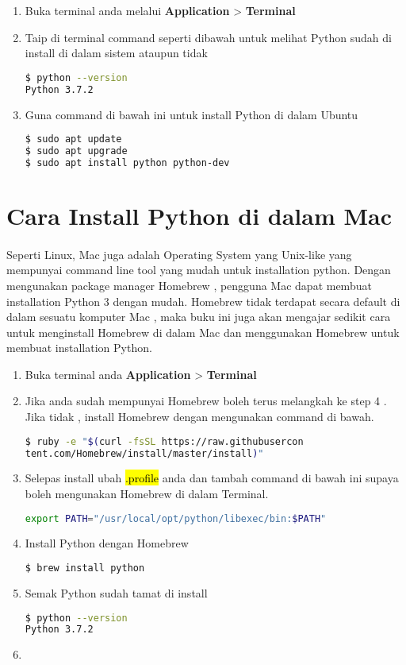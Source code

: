 \begin{enumerate}
	\item Buka terminal anda melalui \textbf{Application} > \textbf{Terminal} 
	\item Taip di terminal command seperti dibawah untuk melihat Python sudah di install di dalam sistem ataupun tidak
		\begin{lstlisting}[language=bash]
$ python --version
Python 3.7.2
		\end{lstlisting}
	\item Guna command di bawah ini untuk install Python di dalam Ubuntu
		\begin{lstlisting}[language=bash]
$ sudo apt update
$ sudo apt upgrade
$ sudo apt install python python-dev
		\end{lstlisting}
\end{enumerate}

\section{Cara Install Python di dalam Mac}


\paragraph{}
Seperti Linux, Mac juga adalah Operating System yang Unix-like yang mempunyai command line tool yang mudah untuk installation python. Dengan mengunakan package manager Homebrew , pengguna Mac dapat membuat installation Python 3 dengan mudah.
Homebrew tidak terdapat secara default di dalam sesuatu komputer Mac , maka buku ini juga akan mengajar sedikit cara untuk menginstall Homebrew di dalam Mac dan menggunakan Homebrew untuk membuat installation Python.

\begin{enumerate}
	\item Buka terminal anda \textbf{Application} > \textbf{Terminal} 
	\item Jika anda sudah mempunyai Homebrew boleh terus melangkah ke step 4 . Jika tidak , install Homebrew dengan mengunakan command di bawah. 
		\begin{lstlisting}[language=bash]
$ ruby -e "$(curl -fsSL https://raw.githubusercon
tent.com/Homebrew/install/master/install)"
		\end{lstlisting}
	\item Selepas install ubah \hl{.profile} anda dan tambah command di bawah ini supaya boleh mengunakan Homebrew di dalam Terminal. 
		\begin{lstlisting}[language=bash]
export PATH="/usr/local/opt/python/libexec/bin:$PATH"
		\end{lstlisting}
	\item Install Python dengan Homebrew
		\begin{lstlisting}[language=bash]
$ brew install python
		\end{lstlisting}
	\item Semak Python sudah tamat di install 
		\begin{lstlisting}[language=bash]
$ python --version
Python 3.7.2
		\end{lstlisting}
	\item {}
\end{enumerate}
